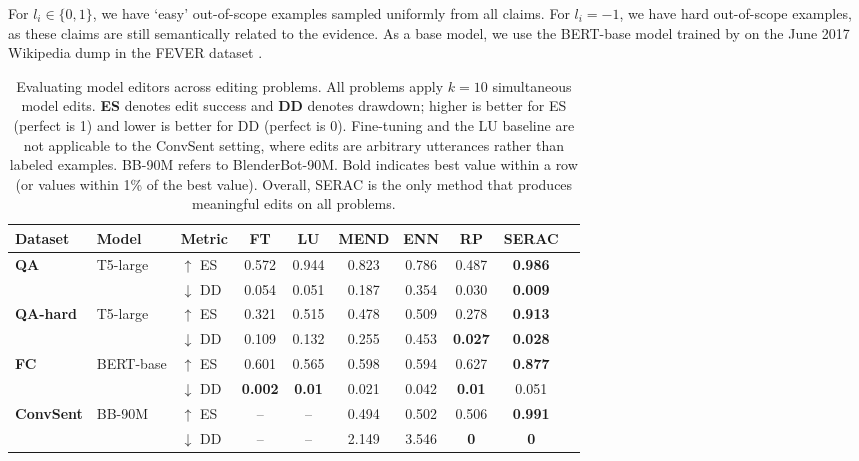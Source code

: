 \documentclass{article}
\newcommand{\name}{SERAC}
\newcommand{\editdata}{\mathcal{D}_{e}}
\newcommand{\ze}[1][]{z_e^{#1}}
\begin{document}
For $l_i \in \{0,1\}$, we have `easy' out-of-scope examples sampled uniformly from all claims. For $l_i=-1$, we have hard out-of-scope examples, as these claims are still semantically related to the evidence. As a base model, we use the BERT-base model trained by \citet{Cao2021EditingFK} on the June 2017 Wikipedia dump in the FEVER dataset \citep{Thorne18Fever}.


\begin{table}[t]
    \centering
    \begin{tabular}{lllccccccc}
        \toprule
        Dataset & Model & Metric & FT & LU & MEND & ENN & RP & {\name} \\
        \midrule
        \multirow{2}{*}{\textbf{QA}} & \multirow{2}{*}{T5-large}
          & $\uparrow$ ES & 0.572 & 0.944 & 0.823 & 0.786 & 0.487 & \textbf{0.986} \\
        & & $\downarrow$ DD & 0.054 & 0.051 & 0.187 & 0.354 & 0.030 & \textbf{0.009} \\
        \midrule
        \multirow{2}{*}{\textbf{QA-hard}} & \multirow{2}{*}{T5-large} 
          & $\uparrow$ ES & 0.321 & 0.515 & 0.478 & 0.509 & 0.278 & \textbf{0.913} \\
        & & $\downarrow$ DD & 0.109 & 0.132 & 0.255 & 0.453 & \textbf{0.027} & \textbf{0.028} \\
        \midrule
        \multirow{2}{*}{\textbf{FC}} & \multirow{2}{*}{BERT-base}
          & $\uparrow$ ES & 0.601 & 0.565 & 0.598 & 0.594 & 0.627 & \textbf{0.877} \\
        & & $\downarrow$ DD & \textbf{0.002} & \textbf{0.01} & 0.021 & 0.042 & \textbf{0.01} & 0.051 \\
        \midrule
        \multirow{2}{*}{\textbf{ConvSent}} & \multirow{2}{*}{BB-90M}
          & $\uparrow$ ES & -- & -- & 0.494 & 0.502 & 0.506 & \textbf{0.991} \\
        & & $\downarrow$ DD & -- & -- & 2.149 & 3.546 & \textbf{0} & \textbf{0} \\
        \bottomrule
    \end{tabular}
    \caption{Evaluating model editors across editing problems. All problems apply $k=10$ simultaneous model edits. \textbf{ES} denotes edit success and \textbf{DD} denotes drawdown; higher is better for ES (perfect is 1) and lower is better for DD (perfect is 0). Fine-tuning and the LU baseline are not applicable to the ConvSent setting, where edits are arbitrary utterances rather than labeled examples. BB-90M refers to BlenderBot-90M. Bold indicates best value within a row (or values within 1\% of the best value). Overall, {\name} is the only method that produces meaningful edits on all problems.}
    \label{tab:main-comparison}
\end{table}
\end{document}
